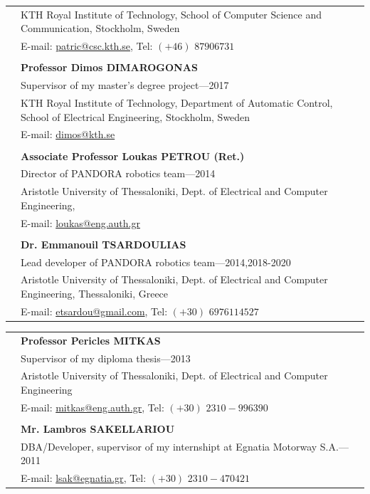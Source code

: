 \documentclass[a4paper,10pt,twoside]{article}
\begin{document}
\begin{tabular}{rp{14cm}}
&KTH Royal Institute of Technology, School of Computer Science and Communication, Stockholm, Sweden \\
& E-mail: \href{mailto: patric@csc.kth.se}{patric@csc.kth.se}, Tel: $(+46)$ $8 790 67 31$ \\
&\\
& \textbf{Professor Dimos DIMAROGONAS}\\
& {Supervisor of my master's degree project}---2017\\
&KTH Royal Institute of Technology, Department of Automatic Control, School of Electrical Engineering, Stockholm, Sweden \\
& E-mail: \href{mailto: dimos@kth.se}{dimos@kth.se} \\
&\\
& \textbf{Associate Professor Loukas PETROU (Ret.)}\\
& {Director of PANDORA robotics team}---2014\\
&Aristotle University of Thessaloniki, Dept. of Electrical and Computer Engineering,\\
& E-mail: \href{mailto: loukas@eng.auth.gr}{loukas@eng.auth.gr} \\
&\\
& \textbf{Dr. Emmanouil TSARDOULIAS}\\
& {Lead developer of PANDORA robotics team}---2014,2018-2020\\
&Aristotle University of Thessaloniki, Dept. of Electrical and Computer Engineering, Thessaloniki, Greece \\
& E-mail: \href{mailto: etsardou@gmail.com}{etsardou@gmail.com}, Tel: $(+30)$ $697 611 4527$ \\
\end{tabular}
\newpage\noindent
\begin{tabular}{rp{14cm}}
& \textbf{Professor Pericles MITKAS}\\
& {Supervisor of my diploma thesis}---2013\\
&Aristotle University of Thessaloniki, Dept. of Electrical and Computer Engineering\\
& E-mail: \href{mailto: mitkas@eng.auth.gr}{mitkas@eng.auth.gr}, Tel: $(+30)$ $2310-996390$ \\
&\\
& \textbf{Mr. Lambros SAKELLARIOU}\\
& {DBA/Developer, supervisor of my internshipt at Egnatia Motorway S.A.}---2011\\
& E-mail: \href{mailto: lsak@egnatia.gr}{lsak@egnatia.gr}, Tel: $(+30)$ $2310 - 470421$ \\
\end{tabular}
\end{document}
